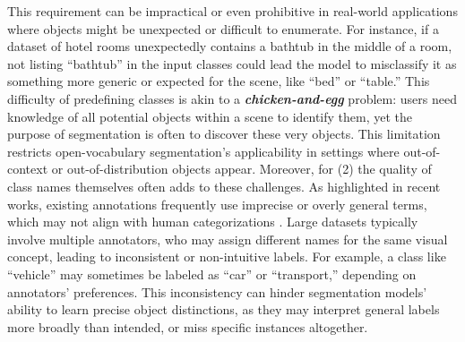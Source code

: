 This requirement can be impractical or even prohibitive in real-world applications where objects might be unexpected or difficult to enumerate. For instance, if a dataset of hotel rooms unexpectedly contains a bathtub in the middle of a room, not listing “bathtub” in the input classes could lead the model to misclassify it as something more generic or expected for the scene, like “bed” or “table.” This difficulty of predefining classes is akin to a \textbf{\textit{chicken-and-egg}} problem: users need knowledge of all potential objects within a scene to identify them, yet the purpose of segmentation is often to discover these very objects. This limitation restricts open-vocabulary segmentation’s applicability in settings where out-of-context or out-of-distribution objects appear.
Moreover, for (2) the quality of class names themselves often adds to these challenges. As highlighted in recent works, existing annotations frequently use imprecise or overly general terms, which may not align with human categorizations \cite{huang2024renovating}. Large datasets typically involve multiple annotators, who may assign different names for the same visual concept, leading to inconsistent or non-intuitive labels. For example, a class like ``vehicle'' may sometimes be labeled as ``car'' or ``transport,'' depending on annotators' preferences. This inconsistency can hinder segmentation models’ ability to learn precise object distinctions, as they may interpret general labels more broadly than intended, or miss specific instances altogether.

